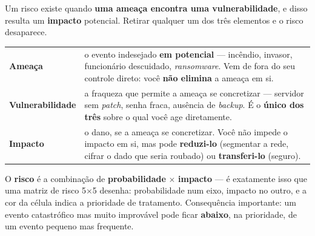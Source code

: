 \begin{conceito}[Ameaça + vulnerabilidade = risco, resultando em impacto]
Um risco existe quando \textbf{uma ameaça encontra uma vulnerabilidade},
e disso resulta um \textbf{impacto} potencial. Retirar qualquer um dos
três elementos e o risco desaparece.

\begin{center}
\begin{tabular}{@{}p{3cm}p{9cm}@{}}
\toprule
\textbf{Ameaça} & o evento indesejado \textbf{em potencial} --- incêndio,
invasor, funcionário descuidado, \textit{ransomware}. Vem de fora do seu
controle direto: você \textbf{não elimina} a ameaça em si. \\
\textbf{Vulnerabilidade} & a fraqueza que permite a ameaça se
concretizar --- servidor sem \textit{patch}, senha fraca, ausência de
\textit{backup}. É o \textbf{único dos três} sobre o qual você age
diretamente. \\
\textbf{Impacto} & o dano, se a ameaça se concretizar. Você não impede o
impacto em si, mas pode \textbf{reduzi-lo} (segmentar a rede, cifrar o
dado que seria roubado) ou \textbf{transferi-lo} (seguro). \\
\bottomrule
\end{tabular}
\end{center}

O \textbf{risco} é a combinação de \textbf{probabilidade} $\times$
\textbf{impacto} --- é exatamente isso que uma matriz de risco 5$\times$5
desenha: probabilidade num eixo, impacto no outro, e a cor da célula
indica a prioridade de tratamento. Consequência importante: um evento
catastrófico mas muito improvável pode ficar \textbf{abaixo}, na
prioridade, de um evento pequeno mas frequente.
\end{conceito}

